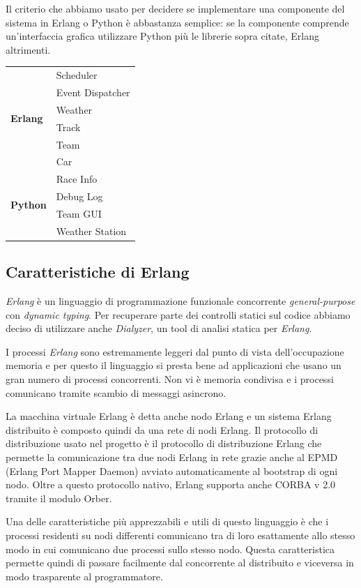 \documentclass[11pt,a4paper]{report}
\begin{document}
Il criterio che abbiamo usato per decidere se implementare una componente del sistema in Erlang o Python è abbastanza semplice: se la componente comprende un'interfaccia grafica utilizzare Python più le librerie sopra citate, Erlang altrimenti.
\begin{center}
\begin{tabular}{|p{}|p{}|}
\hline
\multirow{6}{*}{\textbf{Erlang}} & Scheduler\\
& Event Dispatcher\\
& Weather\\
& Track\\
& Team\\
& Car \\
\hline
\multirow{4}{*}{\textbf{Python}} & Race Info\\
& Debug Log\\
& Team GUI\\
& Weather Station\\
\hline
\end{tabular}
\end{center}
\subsection*{Caratteristiche di Erlang}
\textit{Erlang} è un linguaggio di programmazione funzionale concorrente \textit{general-purpose} con \textit{dynamic typing}. Per recuperare parte dei controlli statici sul codice abbiamo deciso di utilizzare anche \textit{Dialyzer}, un tool di analisi statica per \textit{Erlang}.

I processi \textit{Erlang} sono estremamente leggeri dal punto di vista dell'occupazione memoria e per questo il linguaggio si presta bene ad applicazioni che usano un gran numero di processi concorrenti. Non vi è memoria condivisa e i processi comunicano tramite scambio di messaggi asincrono.

La macchina virtuale Erlang è detta anche nodo Erlang e un sistema Erlang distribuito è composto quindi da una rete di nodi Erlang. Il protocollo di distribuzione usato nel progetto è il protocollo di distribuzione Erlang che permette la comunicazione tra due nodi Erlang in rete grazie anche al EPMD (Erlang Port Mapper Daemon) avviato automaticamente al bootstrap di ogni nodo. Oltre a questo protocollo nativo, Erlang supporta anche CORBA v 2.0 tramite il modulo Orber.

Una delle caratteristiche più apprezzabili e utili di questo linguaggio è che i processi residenti su nodi differenti comunicano tra di loro esattamente allo stesso modo in cui comunicano due processi sullo stesso nodo. Questa caratteristica permette quindi di passare facilmente dal concorrente al distribuito e viceversa in modo trasparente al programmatore.
\end{document}
